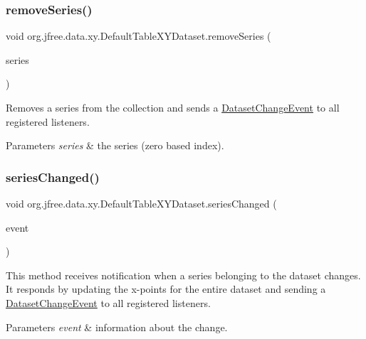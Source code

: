 \subsubsection{\texorpdfstring{remove\+Series()}{removeSeries()}\hspace{0.1cm}{\footnotesize\ttfamily [2/2]}}
{\footnotesize\ttfamily void org.\+jfree.\+data.\+xy.\+Default\+Table\+X\+Y\+Dataset.\+remove\+Series (\begin{DoxyParamCaption}\item[{int}]{series }\end{DoxyParamCaption})}

Removes a series from the collection and sends a \mbox{\hyperlink{}{Dataset\+Change\+Event}} to all registered listeners.


\begin{DoxyParams}{Parameters}
{\em series} & the series (zero based index). \\
\hline
\end{DoxyParams}
\mbox{\label{classorg_1_1jfree_1_1data_1_1xy_1_1_default_table_x_y_dataset_ad55c61c1cd535e757c2542daf8c36808}} 
\subsubsection{\texorpdfstring{series\+Changed()}{seriesChanged()}}
{\footnotesize\ttfamily void org.\+jfree.\+data.\+xy.\+Default\+Table\+X\+Y\+Dataset.\+series\+Changed (\begin{DoxyParamCaption}\item[{\mbox{\hyperlink{classorg_1_1jfree_1_1data_1_1general_1_1_series_change_event}{Series\+Change\+Event}}}]{event }\end{DoxyParamCaption})}

This method receives notification when a series belonging to the dataset changes. It responds by updating the x-\/points for the entire dataset and sending a \mbox{\hyperlink{}{Dataset\+Change\+Event}} to all registered listeners.


\begin{DoxyParams}{Parameters}
{\em event} & information about the change. \\
\hline
\end{DoxyParams}



